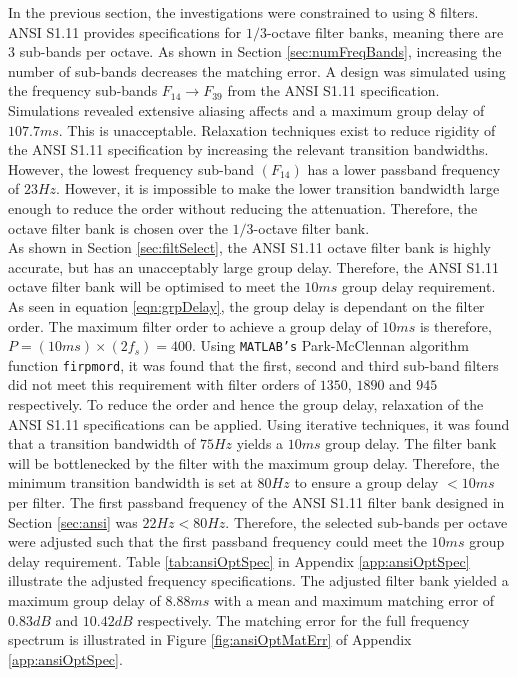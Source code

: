 \documentclass[11pt,onecolumn]{witseiepaper}
\begin{document}
\noindent In the previous section, the investigations were constrained to using 8 filters. ANSI S1.11 provides specifications for $1/3$-octave filter banks, meaning there are $3$ sub-bands per octave. As shown in Section \ref{sec:numFreqBands}, increasing the number of sub-bands decreases the matching error. A design was simulated using the frequency sub-bands $F_{14} \rightarrow F_{39}$ from the ANSI S1.11 specification. Simulations revealed extensive aliasing affects and a maximum group delay of $107.7ms$. This is unacceptable. Relaxation techniques exist to reduce rigidity of the ANSI S1.11 specification by increasing the relevant transition bandwidths. However, the lowest frequency sub-band $(F_{14})$ has a lower passband frequency of $23Hz$. However, it is impossible to make the lower transition bandwidth large enough to reduce the order without reducing the attenuation. Therefore, the octave filter bank is chosen over the $1/3$-octave filter bank.\\
\newline
\noindent As shown in Section \ref{sec:filtSelect}, the ANSI S1.11 octave filter bank is highly accurate, but has an unacceptably large group delay. Therefore, the ANSI S1.11 octave filter bank will be optimised to meet the $10ms$ group delay requirement. As seen in equation \ref{eqn:grpDelay}, the group delay is dependant on the filter order. The maximum filter order to achieve a group delay of $10ms$ is therefore, $P = (10ms)\times (2f_s) = 400$. Using \texttt{MATLAB's} Park-McClennan algorithm function \texttt{firpmord}, it was found that the first, second and third sub-band filters did not meet this requirement with filter orders of $1350$, $1890$ and $945$ respectively. To reduce the order and hence the group delay, relaxation of the ANSI S1.11 specifications can be applied. Using iterative techniques, it was found that a transition bandwidth of $75Hz$ yields a $10ms$ group delay. The filter bank will be bottlenecked by the filter with the maximum group delay. Therefore, the minimum transition bandwidth is set at $80Hz$ to ensure a group delay $<10ms$ per filter. The first passband frequency of the ANSI S1.11 filter bank designed in Section \ref{sec:ansi} was $22Hz<80Hz$. Therefore, the selected sub-bands per octave were adjusted such that the first passband frequency could meet the $10ms$ group delay requirement. Table \ref{tab:ansiOptSpec} in Appendix \ref{app:ansiOptSpec} illustrate the adjusted frequency specifications. The adjusted filter bank yielded a maximum group delay of $8.88ms$ with a mean and maximum matching error of $0.83dB$ and $10.42dB$ respectively. The matching error for the full frequency spectrum is illustrated in Figure \ref{fig:ansiOptMatErr} of Appendix \ref{app:ansiOptSpec}. 
\end{document}
